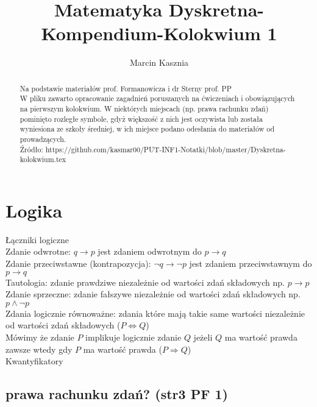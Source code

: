\documentclass[a4paper,12pt]{article}
\title{Matematyka Dyskretna-Kompendium-Kolokwium 1}
\author{Marcin Kasznia}
\begin{document}
\maketitle
\begin{abstract}
Na podstawie materiałów prof. Formanowicza i dr Sterny prof. PP\\
W pliku zawarto opracowanie zagadnień poruszanych na ćwiczeniach i obowiązujących na pierwszym kolokwium. W niektórych miejscach (np. prawa rachunku zdań) pominięto rozległe symbole, gdyż większość z nich jest oczywista lub została wyniesiona ze szkoły średniej, w ich miejsce podano odesłania do materiałów od prowadzących.\\
Źródło: https://github.com/kasmar00/PUT-INF1-Notatki/blob/master/Dyskretna-kolokwium.tex \\
\end{abstract}

\section{Logika}
Łączniki logiczne \\
Zdanie odwrotne: $q \to p$ jest zdaniem odwrotnym do $p \to q$ \\
Zdanie przeciwstawne (kontrapozycja): $\neg q \to \neg p$ jest zdaniem przeciwstawnym do $p \to q$ \\
Tautologia: zdanie prawdziwe niezależnie od wartości zdań składowych np. $p\to p$ \\
Zdanie sprzeczne: zdanie fałszywe niezależnie od wartości zdań składowych np. $p \land \neg p $ \\
Zdania logicznie równoważne: zdania które mają takie same wartości niezależnie od wartości zdań składowych ($P \Leftrightarrow Q $) \\
Mówimy że zdanie $P$ implikuje logicznie zdanie $Q$ jeżeli $Q$ ma wartość prawda zawsze wtedy gdy $P$ ma wartość prawda ($P \Rightarrow Q$)\\
Kwantyfikatory
\subsection{prawa rachunku zdań? (str3 PF 1)}
\end{document}
